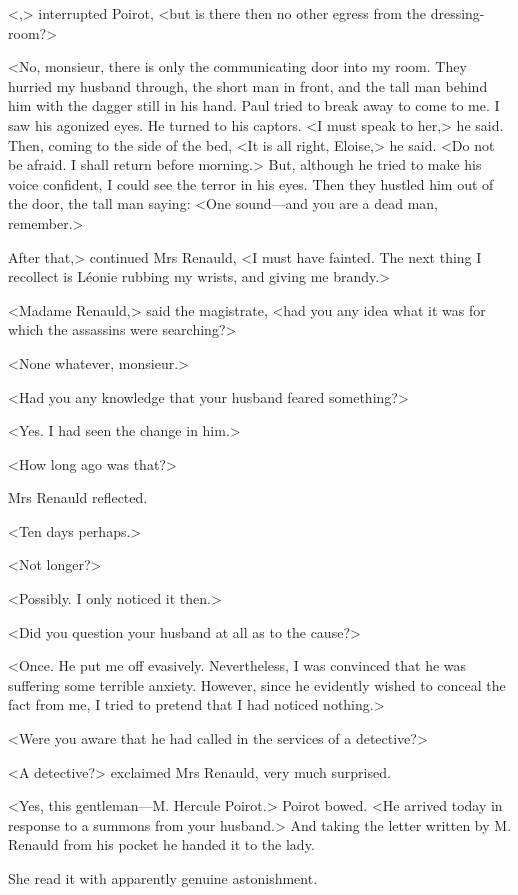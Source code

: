  <,> interrupted Poirot, <but is there then no other egress from the dressing-room?> 

 <No, monsieur, there is only the communicating door into my room. They hurried my husband through, the short man in front, and the tall man behind him with the dagger still in his hand. Paul tried to break away to come to me. I saw his agonized eyes. He turned to his captors. <I must speak to her,> he said. Then, coming to the side of the bed, <It is all right, Eloise,> he said. <Do not be afraid. I shall return before morning.> But, although he tried to make his voice confident, I could see the terror in his eyes. Then they hustled him out of the door, the tall man saying: <One sound—and you are a dead man, remember.> 

 After that,> continued Mrs Renauld, <I must have fainted. The next thing I recollect is Léonie rubbing my wrists, and giving me brandy.> 

 <Madame Renauld,> said the magistrate, <had you any idea what it was for which the assassins were searching?> 

 <None whatever, monsieur.> 

 <Had you any knowledge that your husband feared something?> 

 <Yes. I had seen the change in him.> 

 <How long ago was that?> 

 Mrs Renauld reflected. 

 <Ten days perhaps.> 

 <Not longer?> 

 <Possibly. I only noticed it then.> 

 <Did you question your husband at all as to the cause?> 

 <Once. He put me off evasively. Nevertheless, I was convinced that he was suffering some terrible anxiety. However, since he evidently wished to conceal the fact from me, I tried to pretend that I had noticed nothing.> 

 <Were you aware that he had called in the services of a detective?> 

 <A detective?> exclaimed Mrs Renauld, very much surprised. 

 <Yes, this gentleman—M. Hercule Poirot.> Poirot bowed. <He arrived today in response to a summons from your husband.> And taking the letter written by M. Renauld from his pocket he handed it to the lady. 

 She read it with apparently genuine astonishment. 

